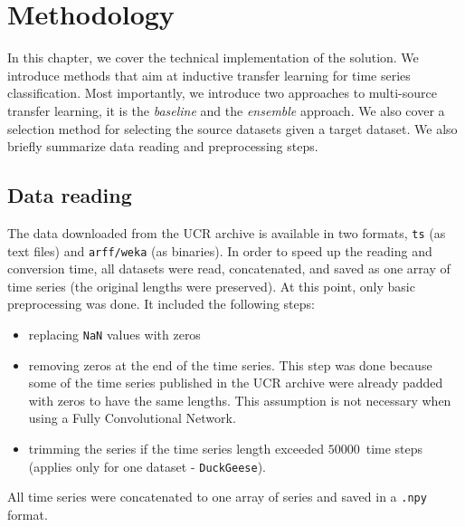 \documentclass[a4paper,11pt,twoside]{report}
\theoremstyle{definition}
\begin{document}
\chapter{Methodology}
In this chapter, we cover the technical implementation of the solution. We introduce methods that aim at inductive transfer learning for time series classification. Most importantly, we introduce two approaches to multi-source transfer learning, it is the \textit{baseline} and the \textit{ensemble} approach. We also cover a selection method for selecting the source datasets given a target dataset. We also briefly summarize data reading and preprocessing steps.

\section{Data reading}\label{section:reading}
The data downloaded from the UCR archive is available in two formats, \texttt{ts} (as text files) and \texttt{arff/weka} (as binaries). In order to speed up the reading and conversion time, all datasets were read, concatenated, and saved as one array of time series (the original lengths were preserved). At this point, only basic preprocessing was done. It included the following steps:
\begin{itemize}
\item replacing \texttt{NaN} values with zeros
\item removing zeros at the end of the time series. This step was done because some of the time series published in the UCR archive were already padded with zeros to have the same lengths. This assumption is not necessary when using a Fully Convolutional Network.
\item trimming the series if the time series length exceeded $50 000$~time steps (applies only for one dataset - \texttt{DuckGeese}).


\end{itemize}

All time series were concatenated to one array of series and saved in a \texttt{.npy} format.
\end{document}
